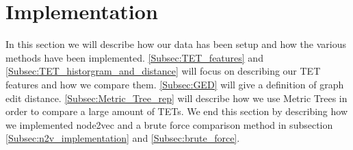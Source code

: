 \section{Implementation}\label{Sec:Implementation}
In this section we will describe how our data has been setup and how the various methods have been implemented. \autoref{Subsec:TET_features} and \autoref{Subsec:TET_historgram_and_distance} will focus on describing our TET features and how we compare them.
\autoref{Subsec:GED} will give a definition of graph edit distance. \autoref{Subsec:Metric_Tree_rep} will describe how we use Metric Trees in order to compare a large amount of TETs. We end this section by describing how we implemented node2vec and a brute force comparison method in subsection \autoref{Subsec:n2v_implementation} and \autoref{Subsec:brute_force}.







